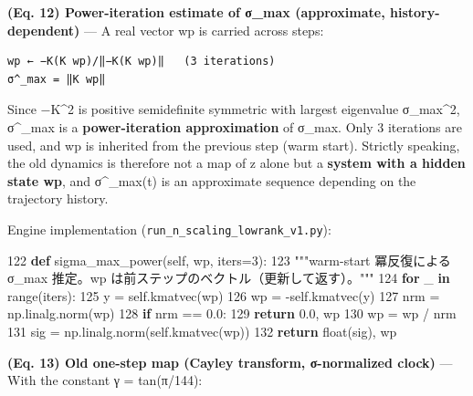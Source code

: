 \documentclass[
  a4paper,
]{ltjsarticle}
\newenvironment{Shaded}{}{}
\newcommand{\BuiltInTok}[1]{\textcolor[rgb]{0.00,0.50,0.00}{#1}}
\newcommand{\ControlFlowTok}[1]{\textcolor[rgb]{0.00,0.44,0.13}{\textbf{#1}}}
\newcommand{\DecValTok}[1]{\textcolor[rgb]{0.25,0.63,0.44}{#1}}
\newcommand{\FloatTok}[1]{\textcolor[rgb]{0.25,0.63,0.44}{#1}}
\newcommand{\KeywordTok}[1]{\textcolor[rgb]{0.00,0.44,0.13}{\textbf{#1}}}
\newcommand{\NormalTok}[1]{#1}
\newcommand{\OperatorTok}[1]{\textcolor[rgb]{0.40,0.40,0.40}{#1}}
\newcommand{\StringTok}[1]{\textcolor[rgb]{0.25,0.44,0.63}{#1}}
\newcommand{\VariableTok}[1]{\textcolor[rgb]{0.10,0.09,0.49}{#1}}
\begin{document}
\textbf{(Eq. 12) Power-iteration estimate of σ\_max (approximate,
history-dependent)} --- A real vector wp is carried across steps:

\begin{verbatim}
wp ← −K(K wp)/‖−K(K wp)‖   (3 iterations)
σ^_max = ‖K wp‖
\end{verbatim}

Since −K\^{}2 is positive semidefinite symmetric with largest eigenvalue
σ\_max\^{}2, σ\^{}\_max is a \textbf{power-iteration approximation} of
σ\_max. Only 3 iterations are used, and wp is inherited from the
previous step (warm start). Strictly speaking, the old dynamics is
therefore not a map of z alone but a \textbf{system with a hidden state
wp}, and σ\^{}\_max(t) is an approximate sequence depending on the
trajectory history.

Engine implementation (\texttt{run\_n\_scaling\_lowrank\_v1.py}):

\begin{Shaded}
\begin{Highlighting}[]
   \DecValTok{122}      \KeywordTok{def}\NormalTok{ sigma\_max\_power(}\VariableTok{self}\NormalTok{, wp, iters}\OperatorTok{=}\DecValTok{3}\NormalTok{):}
   \DecValTok{123}          \StringTok{"""warm{-}start 冪反復による σ\_max 推定。wp は前ステップのベクトル（更新して返す）。"""}
   \DecValTok{124}          \ControlFlowTok{for}\NormalTok{ \_ }\KeywordTok{in} \BuiltInTok{range}\NormalTok{(iters):}
   \DecValTok{125}\NormalTok{              y }\OperatorTok{=} \VariableTok{self}\NormalTok{.kmatvec(wp)}
   \DecValTok{126}\NormalTok{              wp }\OperatorTok{=} \OperatorTok{{-}}\VariableTok{self}\NormalTok{.kmatvec(y)}
   \DecValTok{127}\NormalTok{              nrm }\OperatorTok{=}\NormalTok{ np.linalg.norm(wp)}
   \DecValTok{128}              \ControlFlowTok{if}\NormalTok{ nrm }\OperatorTok{==} \FloatTok{0.0}\NormalTok{:}
   \DecValTok{129}                  \ControlFlowTok{return} \FloatTok{0.0}\NormalTok{, wp}
   \DecValTok{130}\NormalTok{              wp }\OperatorTok{=}\NormalTok{ wp }\OperatorTok{/}\NormalTok{ nrm}
   \DecValTok{131}\NormalTok{          sig }\OperatorTok{=}\NormalTok{ np.linalg.norm(}\VariableTok{self}\NormalTok{.kmatvec(wp))}
   \DecValTok{132}          \ControlFlowTok{return} \BuiltInTok{float}\NormalTok{(sig), wp}
\end{Highlighting}
\end{Shaded}

\textbf{(Eq. 13) Old one-step map (Cayley transform, σ-normalized
clock)} --- With the constant γ = tan(π/144):
\end{document}
